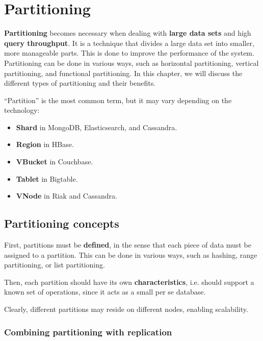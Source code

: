 \chapter{Partitioning}

\textbf{Partitioning} becomes necessary when dealing with \textbf{large data sets} and high \textbf{query throughput}. It is a technique that divides a large data set into smaller, more manageable parts. This is done to improve the performance of the system. Partitioning can be done in various ways, such as horizontal partitioning, vertical partitioning, and functional partitioning. In this chapter, we will discuss the different types of partitioning and their benefits.

``Partition'' is the most common term, but it may vary depending on the technology:
\begin{itemize}
   \item \textbf{Shard} in MongoDB, Elasticsearch, and Cassandra.
   \item \textbf{Region} in HBase.
   \item \textbf{VBucket} in Couchbase.
   \item \textbf{Tablet} in Bigtable.
   \item \textbf{VNode} in Riak and Cassandra.	
\end{itemize} 

\section{Partitioning concepts}
First, partitions must be \textbf{defined}, in the sense that each piece of data must be assigned to a partition. This can be done in various ways, such as hashing, range partitioning, or list partitioning.

Then, each partition should have its own \textbf{characteristics}, i.e. should support a known set of operations, since it acts as a small per se database.

Clearly, different partitions may reside on different nodes, enabling scalability.


\subsection{Combining partitioning with replication}

